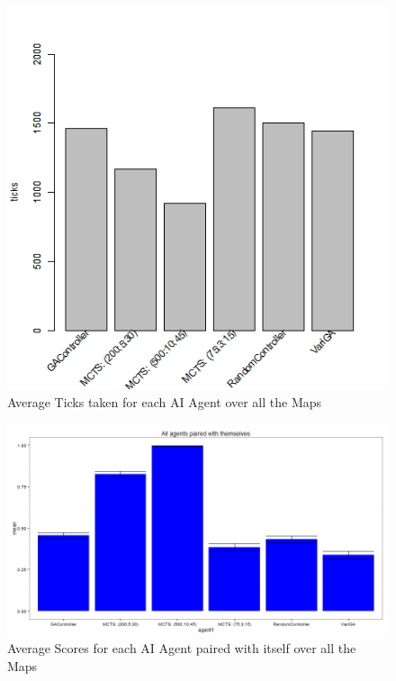 \documentclass{IEEEtran}
\begin{document}
\begin{figure}[ht]
\centering
\includegraphics[width=\linewidth]{ticks-allmaps}
\caption{Average Ticks taken for each AI Agent over all the Maps}
\label{avgTicksAllMaps}
\end{figure}

\begin{figure}[ht]
\centering
\includegraphics[width=\linewidth]{scores-samepairs}
\caption{Average Scores for each AI Agent paired with itself over all the Maps}
\label{avgScorePairAllMaps}
\end{figure}
\end{document}
